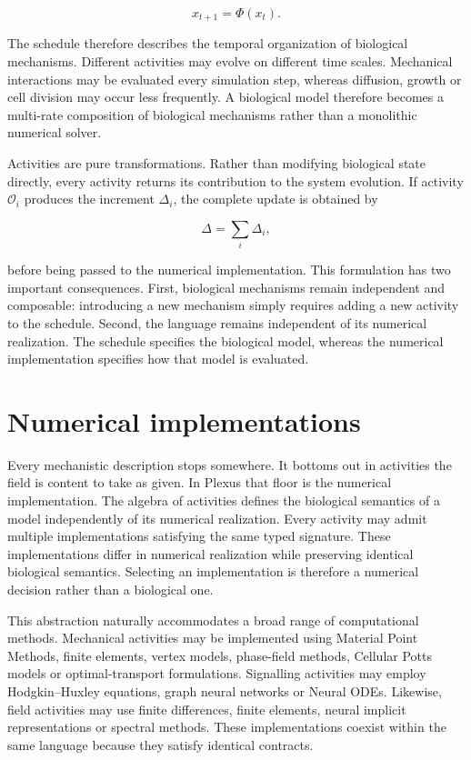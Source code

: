 \documentclass[11pt]{article}
\begin{document}
\[
x_{t+1}
=
\Phi(x_t).
\]

The schedule therefore describes the temporal organization of biological
mechanisms. Different activities may evolve on different time scales. Mechanical
interactions may be evaluated every simulation step, whereas diffusion, growth or cell
division may occur less frequently. A biological model therefore becomes a multi-rate
composition of biological mechanisms rather than a monolithic numerical solver.

Activities are pure transformations. Rather than modifying biological state directly,
every activity returns its contribution to the system evolution. If activity
$\mathcal O_i$ produces the increment $\Delta_i$, the complete update is obtained by

\[
\Delta
=
\sum_i
\Delta_i,
\]

before being passed to the numerical implementation. This formulation has two
important consequences. First, biological mechanisms remain independent and
composable: introducing a new mechanism simply requires adding a new activity to the
schedule. Second, the language remains independent of its numerical realization. The
schedule specifies the biological model, whereas the numerical implementation
specifies how that model is evaluated.

\section{Numerical implementations}

Every mechanistic description stops somewhere. It bottoms out in activities the field
is content to take as given. In Plexus that floor is the numerical implementation. The
algebra of activities defines the biological semantics of a model independently of its
numerical realization. Every activity may admit multiple implementations satisfying the
same typed signature. These implementations differ in numerical realization while
preserving identical biological semantics. Selecting an implementation is therefore a
numerical decision rather than a biological one.

This abstraction naturally accommodates a broad range of computational methods.
Mechanical activities may be implemented using Material Point Methods, finite
elements, vertex models, phase-field methods, Cellular Potts models or
optimal-transport formulations. Signalling activities may employ Hodgkin--Huxley
equations, graph neural networks or Neural ODEs. Likewise, field activities may use
finite differences, finite elements, neural implicit representations or spectral
methods. These implementations coexist within the same language because they satisfy
identical contracts.
\end{document}
